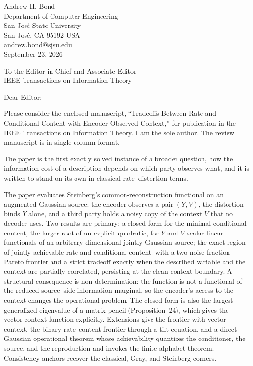 \documentclass[11pt]{article}
\begin{document}
\begin{flushright}
Andrew H. Bond\\
Department of Computer Engineering\\
San Jos\'e State University\\
San Jos\'e, CA 95192 USA\\
andrew.bond@sjsu.edu\\[0.8em]
September 23, 2026
\end{flushright}

To the Editor-in-Chief and Associate Editor\\
IEEE Transactions on Information Theory

Dear Editor:

Please consider the enclosed manuscript, ``Tradeoffs Between Rate and
Conditional Content with Encoder-Observed Context,'' for publication in the IEEE
Transactions on Information Theory. I am the sole author. The review
manuscript is in single-column format.

The paper is the first exactly solved instance of a broader question, how
the information cost of a description depends on which party observes
what, and it is written to stand on its own in classical rate--distortion
terms.

The paper evaluates Steinberg's common-reconstruction functional on an
augmented Gaussian source: the encoder observes a pair $(Y,V)$, the
distortion binds $Y$ alone, and a third party holds a noisy copy of the
context $V$ that no decoder uses. Two results are primary: a closed form
for the minimal conditional content, the larger root of an explicit
quadratic, for $Y$ and $V$ scalar linear functionals of an
arbitrary-dimensional jointly Gaussian source; the exact region of
jointly achievable rate and conditional content, with a two-noise-fraction
Pareto frontier and a strict tradeoff exactly when the described variable
and the context are partially correlated, persisting at the clean-context
boundary. A structural consequence is non-determination: the function is
not a functional of the reduced source--side-information marginal, so the
encoder's access to the context changes the operational problem. The
closed form is also the largest generalized eigenvalue of a matrix pencil
(Proposition~24), which gives the vector-context function explicitly.
Extensions give the frontier with vector context, the binary
rate--content frontier through a tilt equation, and a direct Gaussian
operational theorem whose achievability quantizes the conditioner, the
source, and the reproduction and invokes the finite-alphabet theorem. Consistency anchors
recover the classical, Gray, and Steinberg corners.
\end{document}
